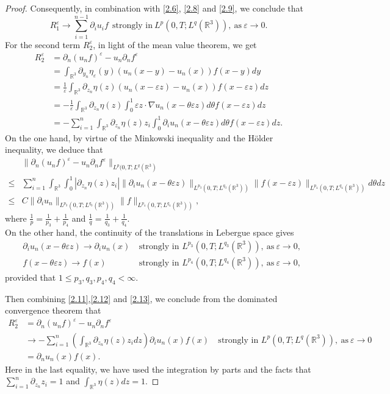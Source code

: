 \documentclass[10pt,a4paper]{amsart}
\newcommand{\ba}{\begin{aligned}}
\newcommand{\be}{\begin{equation}}
\newcommand{\ea}{\end{aligned}}
\newcommand{\ee}{\end{equation}}
\newcommand{\f}{\frac}
\begin{document}
\begin{proof}
Consequently, in combination with \eqref{2.6}, \eqref{2.8} and \eqref{2.9}, we conclude that
\be\label{2.10}
R_1^\varepsilon \rightarrow \sum_{i=1}^{n-1} \partial_i u_i f~~\text{strongly~in}~L^p(0,T;L^q(\mathbb{R}^3)),~\text{as}~\varepsilon \to 0.
\ee
For the second term $R_2^\varepsilon$, in light of the mean value theorem, we get
\be\label{2.11}\ba
R_2^\varepsilon &=\partial_{n}(u_{n}f)^\varepsilon  -   u_{n}\partial_{n}  f^\varepsilon\\
&=\int_{\mathbb{R}^3}\partial_{y_n} \eta_\varepsilon (y)\left(u_n(x-y)-u_n(x)\right)f(x-y) dy\\
&=\f{1}{\varepsilon}\int_{\mathbb{R}^3}\partial_{z_n}\eta(z)\left(u_n(x-\varepsilon z)-u_n(x)\right) f(x-\varepsilon z) dz\\
&=-\f{1}{\varepsilon}\int_{\mathbb{R}^3}\partial_{z_n}\eta(z)\int_0^1 \varepsilon z \cdot \nabla u_{n}(x-\theta \varepsilon z) d\theta  f(x-\varepsilon z) dz\\
&=-\sum_{i=1}^n \int_{\mathbb{R}^3}\partial_{z_n}\eta(z) z_i\int_0^1 \partial_i u_{n}(x-\theta \varepsilon z) d\theta  f(x-\varepsilon z) dz.
\ea\ee
On the one hand, by virtue of the Minkowski inequality and the H\"older inequality, we deduce that
\be\label{2.12}\ba
&\|\partial_{n}(u_{n}f)^\varepsilon  -   u_{n}\partial_{n}  f^\varepsilon\|_{L^p(0,T;L^q(\mathbb{R}^3)}\\
\leq & \sum_{i=1}^n \int_{\mathbb{R}^3}\int_0^1 |\partial_{z_n}\eta (z) z_i |\|\partial_i u_n(x-\theta \varepsilon z)\|_{L^{p_3}(0,T;L^{q_3}(\mathbb{R}^3))}\|f(x-\varepsilon z)\|_{L^{p_4}(0,T;L^{q_4}(\mathbb{R}^3))} d\theta dz\\
\leq& C\|\partial_i u_n\|_{L^{p_3}(0,T;L^{q_3}(\mathbb{R}^3))}\|f\|_{L^{p_4}(0,T;L^{q_4}(\mathbb{R}^3))},
\ea\ee
where $\f{1}{p}=\f{1}{p_3}+\f{1}{p_4}$ and $\f{1}{q}=\f{1}{q_3}+\f{1}{q_4}$.\\
On the other hand, the  continuity of the translations in Lebergue space gives
\be\label{2.13}\ba
&\partial_i u_n(x-\theta \varepsilon z)\rightarrow \partial_i u_n(x)~&\text{strongly~in~} L^{p_3}(0,T;L^{q_3}(\mathbb{R}^3)), ~\text{as} ~\varepsilon \to 0,\\
&f(x-\theta \varepsilon z)\rightarrow f(x)~&\text{strongly~in~} L^{p_4}(0,T;L^{q_4}(\mathbb{R}^3)), ~\text{as} ~\varepsilon \to 0,
\ea\ee
provided that $1\leq p_3,q_3,p_4,q_4<\infty$.

Then combining \eqref{2.11},\eqref{2.12} and \eqref{2.13}, we conclude from the dominated convergence theorem that
\be\label{2.14}\ba
R_2^\varepsilon &=\partial_{n}(u_{n}f)^\varepsilon  -   u_{n}\partial_{n}  f^\varepsilon\\
&\to -\sum_{i=1}^n \left(\int_{\mathbb{R}^3} \partial_{z_n} \eta(z) z_i  dz\right) \partial_i u_n(x) f(x)~&\text{strongly~in~} L^{p}(0,T;L^{q}(\mathbb{R}^3)), ~\text{as} ~\varepsilon \to 0\\
&=\partial_n u_n(x) f(x).
\ea\ee
Here in the last equality, we have used the integration by parts and the facts that $\sum_{i=1}^n \partial_{z_n} z_i=1$ and $\int_{\mathbb{R}^3} \eta(z) dz=1$.


\end{proof}
\end{document}
